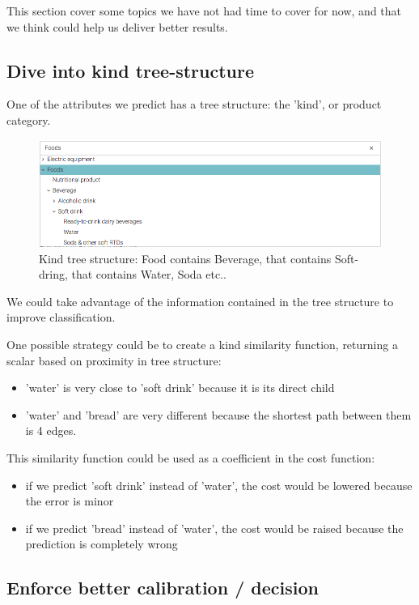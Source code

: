 This section cover some topics we have not had time to cover for now, and that we think could help us deliver better results.

\subsection{Dive into kind tree-structure}
One of the attributes we predict has a tree structure: the 'kind', or product category. 

\begin{figure}[H]
\centering
\includegraphics[scale=0.5]{./images/to-investigate/tree-structure.png}
\caption{Kind tree structure: Food contains Beverage, that contains Soft-dring, that contains Water, Soda etc..}
\end{figure}

We could take advantage of the information contained in the tree structure to improve classification. 

One possible strategy could be to create a kind similarity function, returning a scalar based on proximity in tree structure:
\begin{itemize}
	\item 'water' is very close to 'soft drink' because it is its direct child
	\item 'water' and 'bread' are very different because the shortest path between them is 4 edges.
\end{itemize}

This similarity function could be used as a coefficient in the cost function: 
\begin{itemize}
	\item if we predict 'soft drink' instead of 'water', the cost would be lowered because the error is minor
	\item if we predict 'bread' instead of 'water', the cost would be raised because the prediction is completely wrong
\end{itemize}

\subsection{Enforce better calibration / decision}
